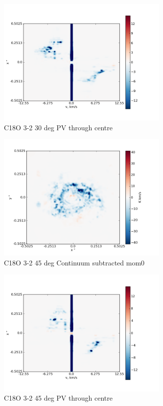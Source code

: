 \documentclass[useAMS,usenatbib]{mn2e}
\begin{document}
%

\begin{figure}
 \includegraphics[width=84mm]{Figures/sim/imageC18O_3-2_30deg_PV_centre.png}

 \caption{C18O 3-2 30 deg PV through centre}
\end{figure}

\begin{figure}
 \includegraphics[width=84mm]{Figures/sim/imageC18O_3-2_45deg_contSub.png}

 \caption{C18O 3-2 45 deg Continuum subtracted mom0}
\end{figure}

%

\begin{figure}
 \includegraphics[width=84mm]{Figures/sim/imageC18O_3-2_45deg_PV_centre.png}

 \caption{C18O 3-2 45 deg PV through centre}
\end{figure}
\end{document}

